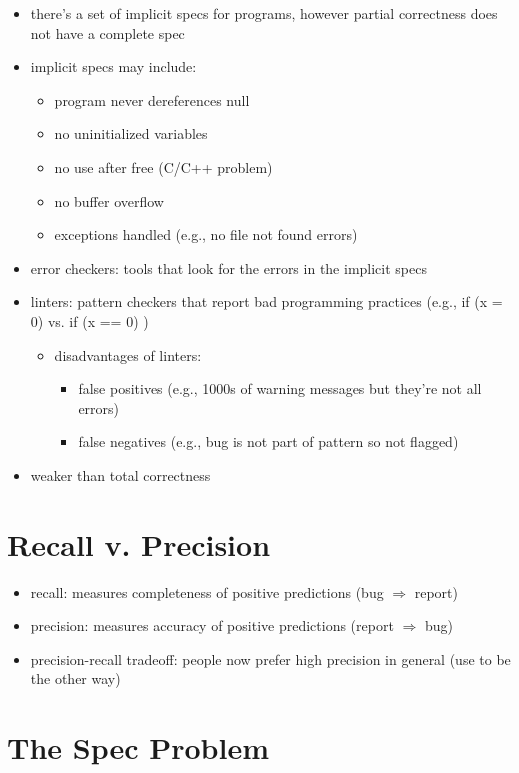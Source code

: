 \documentclass[twoside]{article}
\begin{document}
\begin{itemize}
	\item there's a set of implicit specs for programs, however partial correctness does not have a complete spec
	\item implicit specs may include:
	\begin{itemize}
		\item program never dereferences null
		\item no uninitialized variables
		\item no use after free (C/C++ problem)
		\item no buffer overflow
		\item exceptions handled (e.g., no file not found errors)
	\end{itemize}
	\item error checkers: tools that look for the errors in the implicit specs
	\item linters: pattern checkers that report bad programming practices (e.g., if (x = 0) vs. if (x == 0) )
	\begin{itemize}
		\item disadvantages of linters:
		\begin{itemize}
			\item false positives (e.g., 1000s of warning messages but they're not all errors)
			\item false negatives (e.g., bug is not part of pattern so not flagged)
		\end{itemize}
	\end{itemize}	
	\item weaker than total correctness
\end{itemize}

\section{Recall v. Precision}

\begin{itemize}
	\item recall: measures completeness of positive predictions (bug $\Rightarrow$ report)
	\item precision: measures accuracy of positive predictions (report $\Rightarrow$ bug)
	\item precision-recall tradeoff: people now prefer high precision in general (use to be the other way)
\end{itemize}

\section{The Spec Problem}
\end{document}
